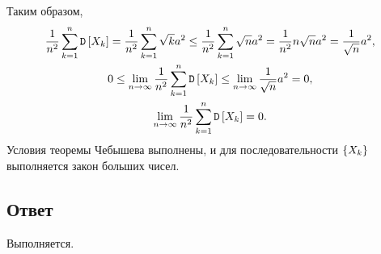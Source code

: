 Таким образом,
\begin{gather}
    \frac{1}{n^2} \sum_{k=1}^n \mathtt{D} \left [ X_k \right ]
    = \frac{1}{n^2} \sum_{k=1}^n \sqrt{k} a^2
    \le \frac{1}{n^2} \sum_{k=1}^n \sqrt{n} a^2
    = \frac{1}{n^2} n \sqrt{n} a^2
    = \frac{1}{\sqrt{n}} a^2 , \\
    0 \le
    \lim_{n \rightarrow \infty} \frac{1}{n^2} \sum_{k=1}^n \mathtt{D} \left [ X_k \right ]
    \le \lim_{n \rightarrow \infty} \frac{1}{\sqrt{n}} a^2 = 0, \\
    \lim_{n \rightarrow \infty} \frac{1}{n^2} \sum_{k=1}^n \mathtt{D} \left [ X_k \right ] = 0 .
\end{gather}
Условия теоремы Чебышева выполнены, и для последовательности $\left \{ X_k \right \}$ выполняется закон больших чисел.

\subsection*{Ответ}
Выполняется.

